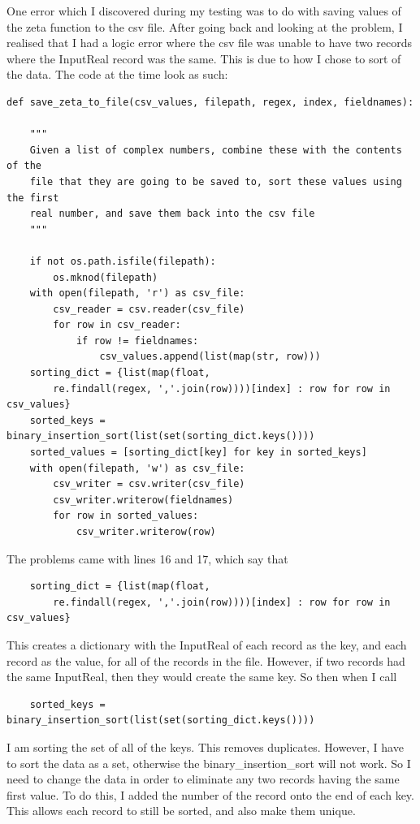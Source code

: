 \documentclass[12pt]{article}
\begin{document}
\clearpage

One error which I discovered during my testing was to do with saving values of the zeta function to the csv file. After going back and looking at the problem, I realised that I had a logic error where the csv file was unable to have two records where the InputReal record was the same. This is due to how I chose to sort of the data. The code at the time look as such:

\begin{lstlisting}
def save_zeta_to_file(csv_values, filepath, regex, index, fieldnames):

    """
    Given a list of complex numbers, combine these with the contents of the
    file that they are going to be saved to, sort these values using the first
    real number, and save them back into the csv file
    """

    if not os.path.isfile(filepath):
        os.mknod(filepath)
    with open(filepath, 'r') as csv_file:
        csv_reader = csv.reader(csv_file)
        for row in csv_reader:
            if row != fieldnames:
                csv_values.append(list(map(str, row)))
    sorting_dict = {list(map(float,
        re.findall(regex, ','.join(row))))[index] : row for row in csv_values}
    sorted_keys = binary_insertion_sort(list(set(sorting_dict.keys())))
    sorted_values = [sorting_dict[key] for key in sorted_keys]
    with open(filepath, 'w') as csv_file:
        csv_writer = csv.writer(csv_file)
        csv_writer.writerow(fieldnames)
        for row in sorted_values:
            csv_writer.writerow(row)
\end{lstlisting}

The problems came with lines 16 and 17, which say that

\begin{lstlisting}
    sorting_dict = {list(map(float,
        re.findall(regex, ','.join(row))))[index] : row for row in csv_values}
\end{lstlisting}

This creates a dictionary with the InputReal of each record as the key, and each record as the value, for all of the records in the file. However, if two records had the same InputReal, then they would create the same key. So then when I call

\begin{lstlisting}
    sorted_keys = binary_insertion_sort(list(set(sorting_dict.keys())))
\end{lstlisting}

I am sorting the set of all of the keys. This removes duplicates. However, I have to sort the data as a set, otherwise the binary\_insertion\_sort will not work. So I need to change the data in order to eliminate any two records having the same first value. To do this, I added the number of the record onto the end of each key. This allows each record to still be sorted, and also make them unique.
\end{document}
